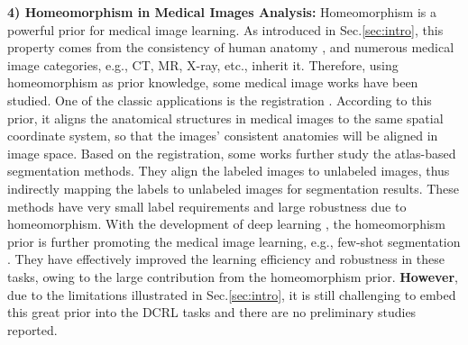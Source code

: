 \textbf{4) Homeomorphism in Medical Images Analysis:} Homeomorphism is a powerful prior for medical image learning. As introduced in Sec.\ref{sec:intro}, this property comes from the consistency of human anatomy \cite{netter2014atlas}, and numerous medical image categories, e.g., CT, MR, X-ray, etc., inherit it. Therefore, using homeomorphism as prior knowledge, some medical image works have been studied. One of the classic applications is the registration \cite{he2021few,7987758,ba2018un,haskins2020deep,dalca2019unsupervised}. According to this prior, it aligns the anatomical structures in medical images to the same spatial coordinate system, so that the images' consistent anatomies will be aligned in image space. Based on the registration, some works \cite{bazin2008homeomorphic,6226425,8014481,wang2020lt,BalakrishnanVoxelMorph(u)} further study the atlas-based segmentation methods. They align the labeled images to unlabeled images, thus indirectly mapping the labels to unlabeled images for segmentation results. These methods have very small label requirements and large robustness due to homeomorphism. With the development of deep learning \cite{lecun2015deep,shen2017deep}, the homeomorphism prior is further promoting the medical image learning, e.g., few-shot segmentation \cite{he2022learning,he2020deep,ding2021modeling,zhao2019data,xu2019deepatlas}. They have effectively improved the learning efficiency and robustness in these tasks, owing to the large contribution from the homeomorphism prior. \textbf{However}, due to the limitations illustrated in Sec.\ref{sec:intro}, it is still challenging to embed this great prior into the DCRL tasks and there are no preliminary studies reported. 